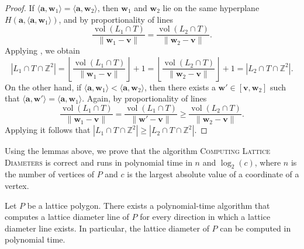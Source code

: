 \documentclass[11pt]{article}
\newcommand{\ba}{\mathbf{a}}
\newcommand{\bv}{\mathbf{v}}
\newcommand{\bw}{\mathbf{w}}
\DeclareMathOperator{\aff}{aff}
\DeclareMathOperator{\nvol}{nvol}
\begin{document}
\begin{proof}
    If $\langle \ba, \bw_1 \rangle = \langle \ba, \bw_2 \rangle$, then $\bw_1$ and $\bw_2$ lie on the same hyperplane $H(\ba, \langle \ba, \bw_1 \rangle)$, and by  proportionality of lines 
\[
\frac{\operatorname{vol}(L_1 \cap T)}{\|\bw_1- \bv\|} = \frac{\operatorname{vol}(L_2 \cap T)}{\|\bw_2- \bv\|}.
\]
Applying , we obtain
\[
|L_1 \cap T \cap \mathbb{Z}^2| = \left\lfloor \frac{\operatorname{vol}(L_1 \cap T)}{\|\bw_1- \bv\|} \right\rfloor + 1= \left\lfloor \frac{\operatorname{vol}(L_2 \cap T)}{\|\bw_2- \bv\|} \right\rfloor + 1 = |L_2 \cap T \cap \mathbb{Z}^2|.
\]
On the other hand, if $\langle \ba, \bw_1 \rangle < \langle \ba, \bw_2 \rangle$, then there exists a $\bw' \in [\bv, \bw_2]$ such that $\langle \ba, \bw' \rangle = \langle \ba, \bw_1 \rangle$. Again, by proportionality of lines
\[
\frac{\operatorname{vol}(L_1 \cap T)}{\|\bw_1- \bv\|} = \frac{\operatorname{vol}(L_1 \cap T)}{\|\bw'- \bv\|} \geq \frac{\operatorname{vol}(L_2 \cap T)}{\|\bw_2- \bv\|}.
\]
Applying  it follows that $|L_1 \cap T \cap \mathbb{Z}^2| \geq |L_2 \cap T \cap \mathbb{Z}^2|$.
\end{proof}


Using the lemmas above, we prove that the algorithm \textsc{Computing Lattice Diameters} is correct and runs in polynomial time in $n$ and $\log_2(c)$, where $n$ is the number of vertices of $P$ and $c$ is the largest absolute value of a coordinate of a vertex.

\begin{theorem}\label{thm:LD-poly}
     Let $P$ be a lattice polygon. There exists a polynomial-time algorithm that computes a lattice diameter line of $P$ for every direction in which a lattice diameter line exists. In particular, the lattice diameter of $P$ can be computed in polynomial time.
\end{theorem}
\end{document}
